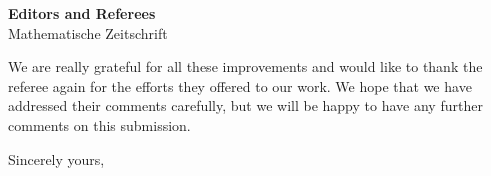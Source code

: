 \documentclass{letter}
\begin{document}
\begin{letter}{{\bf Editors and Referees} \\ Mathematische Zeitschrift}
\begin{itemize}
\end{itemize}

We are really grateful for all these improvements and would like to thank the referee again for the efforts they offered to our work. We hope that we have addressed their comments carefully, but we will be happy to have any further comments on this submission.

%

\closing{Sincerely yours,}

\end{letter}
\end{document}
